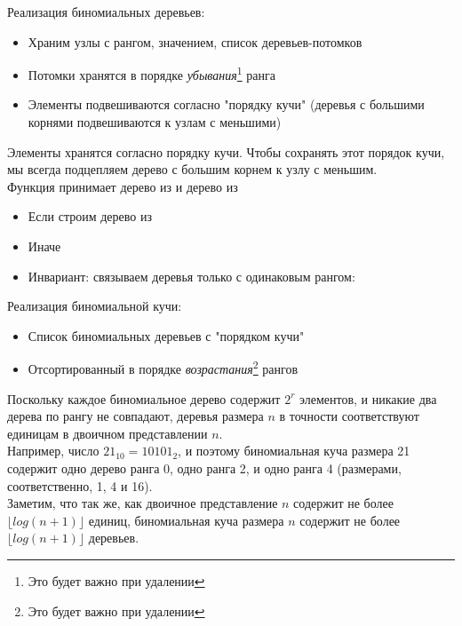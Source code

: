  
 
 
\begin{frame}[fragile]{}
Реализация биномиальных деревьев:
\begin{itemize}
\item Храним узлы с рангом, значением, список деревьев-потомков
\item Потомки хранятся в порядке \emph{убывания}\footnote{Это будет важно при удалении} ранга
\item Элементы подвешиваются согласно "порядку кучи" (деревья с большими корнями подвешиваются к узлам с меньшими)
\end{itemize}

Элементы хранятся согласно порядку кучи.  Чтобы сохранять этот порядок кучи, мы всегда
подцепляем дерево с большим корнем к узлу с меньшим.\\
 
Функция  принимает дерево  из  и дерево  из 
\begin{itemize}
\item Если  строим дерево из 
\item Иначе 
\item Инвариант: связываем деревья только с одинаковым рангом: 
\end{itemize}
\end{frame}
 
 
\begin{frame}[fragile]{}
Реализация биномиальной кучи:
\begin{itemize}
\item Список биномиальных деревьев с "порядком кучи"
\item Отсортированный в порядке \emph{возрастания}\footnote{Это будет важно при удалении} рангов
\end{itemize}
\vspace{1em}

Поскольку каждое биномиальное дерево содержит $2^r$ элементов, и
 никакие два дерева по рангу не совпадают, деревья размера $n$ в
 точности соответствуют единицам в двоичном представлении
 $n$.\\
 
Например, число $21_{10} = 10101_2$, и поэтому биномиальная куча размера 21 содержит одно дерево ранга 0, одно ранга 2, и одно ранга 4 (размерами, соответственно, 1, 4 и 16).\\
 
Заметим, что так же, как двоичное представление $n$ содержит не более $\lfloor log (n+1)\rfloor$ единиц, биномиальная куча размера $n$ содержит не более $\lfloor log(n+1) \rfloor$ деревьев.
\end{frame}
 
